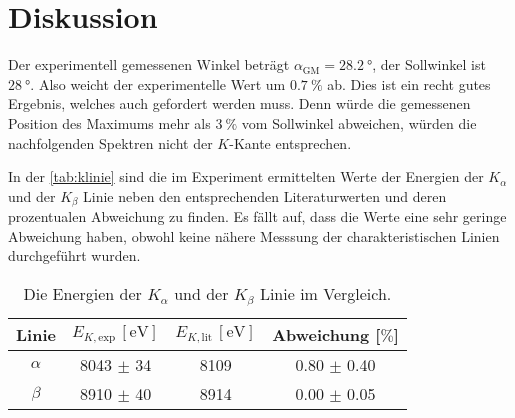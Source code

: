 \section{Diskussion}
\label{sec:Diskussion}

Der experimentell gemessenen Winkel beträgt $\alpha_{\text{GM}} = \SI{28.2}{\degree}$, der Sollwinkel ist $\SI{28}{\degree}$. 
Also weicht der experimentelle Wert um $\SI{0.7}{\percent}$ ab. Dies ist ein recht gutes Ergebnis, welches auch gefordert werden muss. Denn würde die gemessenen
Position des Maximums mehr als $\SI{3}{\percent}$ vom Sollwinkel abweichen, würden die nachfolgenden Spektren nicht der $K$-Kante entsprechen. 

\noindent
In der \autoref{tab:klinie} sind die im Experiment ermittelten Werte der Energien der $K_{\alpha}$ und der $K_{\beta}$ Linie neben den entsprechenden Literaturwerten
und deren prozentualen Abweichung zu finden. Es fällt auf, dass die Werte eine sehr geringe Abweichung haben, obwohl keine nähere Messsung der charakteristischen
Linien durchgeführt wurden.
\begin{table}
    \centering
    \caption{Die Energien der $K_{\alpha}$ und der $K_{\beta}$ Linie im Vergleich.}
    \label{tab:klinie}
    \begin{tabular}{c c c c}
        \toprule
        Linie & $E_{K, \text{exp}} \, [\si{\electronvolt}] $ & $E_{K, \text{lit}} \, [\si{\electronvolt}]$ \cite{E_abs}  & Abweichung [$\si{\percent}$] \\
        \midrule
        $\alpha$ & 8043 $\pm$ 34 & 8109 & 0.80 $\pm$ 0.40 \\ 
        $\beta$  & 8910 $\pm$ 40 & 8914 & 0.00 $\pm$ 0.05 \\  
        \bottomrule      
    \end{tabular}
\end{table}


